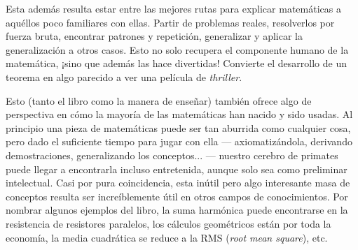 Esta además resulta estar entre las mejores rutas para explicar matemáticas a aquéllos poco familiares con ellas. Partir de problemas reales, resolverlos por fuerza bruta, encontrar patrones y repetición, generalizar y aplicar la generalización a otros casos. Esto no solo recupera el componente humano de la matemática, ¡sino que además las hace divertidas! Convierte el desarrollo de un teorema en algo parecido a ver una película de \textit{thriller}.

Esto (tanto el libro como la manera de enseñar) también ofrece algo de perspectiva en cómo la mayoría de las matemáticas han nacido y sido usadas. Al principio una pieza de matemáticas puede ser tan aburrida como cualquier cosa, pero dado el suficiente tiempo para jugar con ella --- axiomatizándola, derivando demostraciones, generalizando los conceptos... --- nuestro cerebro de primates puede llegar a encontrarla incluso entretenida, aunque solo sea como preliminar intelectual. Casi por pura coincidencia, esta inútil pero algo interesante masa de conceptos resulta ser increíblemente útil en otros campos de conocimientos. Por nombrar algunos ejemplos del libro, la suma harmónica puede encontrarse en la resistencia de resistores paralelos, los cálculos geométricos están por toda la economía, la media cuadrática se reduce a la RMS (\textit{root mean square}), etc.
